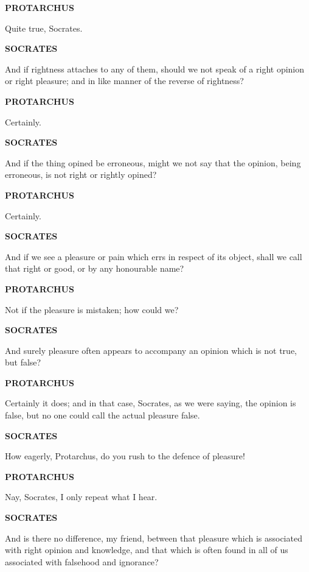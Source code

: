 \documentclass[11pt,letter]{article}
\begin{document}
\par \textbf{PROTARCHUS}
\par   Quite true, Socrates.

\par \textbf{SOCRATES}
\par   And if rightness attaches to any of them, should we not speak of a right opinion or right pleasure; and in like manner of the reverse of rightness?

\par \textbf{PROTARCHUS}
\par   Certainly.

\par \textbf{SOCRATES}
\par   And if the thing opined be erroneous, might we not say that the opinion, being erroneous, is not right or rightly opined?

\par \textbf{PROTARCHUS}
\par   Certainly.

\par \textbf{SOCRATES}
\par   And if we see a pleasure or pain which errs in respect of its object, shall we call that right or good, or by any honourable name?

\par \textbf{PROTARCHUS}
\par   Not if the pleasure is mistaken; how could we?

\par \textbf{SOCRATES}
\par   And surely pleasure often appears to accompany an opinion which is not true, but false?

\par \textbf{PROTARCHUS}
\par   Certainly it does; and in that case, Socrates, as we were saying, the opinion is false, but no one could call the actual pleasure false.

\par \textbf{SOCRATES}
\par   How eagerly, Protarchus, do you rush to the defence of pleasure!

\par \textbf{PROTARCHUS}
\par   Nay, Socrates, I only repeat what I hear.

\par \textbf{SOCRATES}
\par   And is there no difference, my friend, between that pleasure which is associated with right opinion and knowledge, and that which is often found in all of us associated with falsehood and ignorance?
\end{document}
